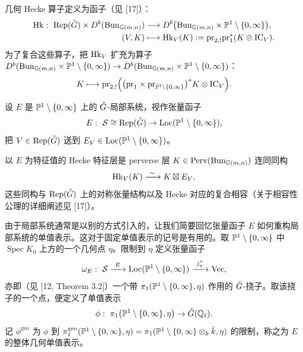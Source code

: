 
几何 Hecke 算子定义为函子（见 [17]）：
\begin{align*}
\mathrm{Hk}:\ \mathrm{Rep}(\check G)\times D^b(\mathrm{Bun}_{\mathbb{G}(m,n)})&\longrightarrow D^b\big(\mathrm{Bun}_{\mathbb{G}(m,n)}\times\mathbb{P}^1\setminus\{0,\infty\}\big),\\
(V,K)&\longmapsto \mathrm{Hk}_V(K):=\mathrm{pr}_{2,!}\mathrm{pr}_1^*(K\otimes\mathrm{IC}_V).
\end{align*}
为了复合这些算子，把 $\mathrm{Hk}_V$ 扩充为算子 $D^b(\mathrm{Bun}_{\mathbb{G}(m,n)}\times\mathbb{P}^1\setminus\{0,\infty\})\to D^b(\mathrm{Bun}_{\mathbb{G}(m,n)}\times\mathbb{P}^1\setminus\{0,\infty\})$：
\[
K\longmapsto \mathrm{pr}_{2,!}\Big(\big(\mathrm{pr}_1\times\mathrm{pr}_{\mathbb{P}^1\setminus\{0,\infty\}}\big)^*K\otimes\mathrm{IC}_V\Big).
\]

设 $E$ 是 $\mathbb{P}^1\setminus\{0,\infty\}$ 上的 $\check G$-局部系统，视作张量函子
\[
E:\ \mathcal S\cong\mathrm{Rep}(\check G)\to\mathrm{Loc}(\mathbb{P}^1\setminus\{0,\infty\}),
\]
把 $V\in\mathrm{Rep}(\check G)$ 送到 $E_V\in\mathrm{Loc}(\mathbb{P}^1\setminus\{0,\infty\})$。

以 $E$ 为特征值的 Hecke 特征层是 perverse 层 $K\in\mathrm{Perv}(\mathrm{Bun}_{\mathbb{G}(m,n)})$ 连同同构
\[
\Hk_V(K)\xrightarrow{\ \sim\ }K\boxtimes E_V,
\]
这些同构与 $\mathrm{Rep}(\check G)$ 上的对称张量结构以及 Hecke 对应的复合相容（关于相容性公理的详细阐述见 [17]）。

\begin{remark}
由于局部系统通常是以别的方式引入的，让我们简要回忆张量函子 $E$ 如何重构局部系统的单值表示。这对于固定单值表示的记号是有用的。取 $\mathbb{P}^1\setminus\{0,\infty\}$ 中 $\operatorname{Spec}K_0$ 上方的一个几何点 $\eta$。限制到 $\eta$ 定义张量函子
\begin{equation}
\omega_E:\ \mathcal S\xrightarrow{\ E\ }\Loc(\PP^1\setminus\{0,\infty\})\xrightarrow{\ j_\eta^*\ }\mathrm{Vec},
\end{equation}
亦即（见 [12, Theorem 3.2]）一个带 $\pi_1(\mathbb{P}^1\setminus\{0,\infty\},\eta)$ 作用的 $\check G$-挠子。取该挠子的一个点，便定义了单值表示
\begin{equation}
\phi:\ \pi_1\big(\PP^1\setminus\{0,\infty\},\eta\big)\to\ckG(\mathbb{Q}_\ell).
\end{equation}
记 $\phi^{\mathrm{geo}}$ 为 $\phi$ 到 $\pi_1^{\mathrm{geo}}(\mathbb{P}^1\setminus\{0,\infty\},\eta)=\pi_1(\mathbb{P}^1\setminus\{0,\infty\}\otimes_k\bar k,\eta)$ 的限制，称之为 $E$ 的整体几何单值表示。
\end{remark}

